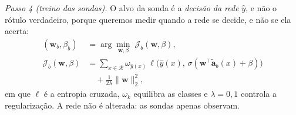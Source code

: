 \emph{Passo 4 (treino das sondas).} O alvo da sonda é a \emph{decisão da rede} $\hat y$, e não o rótulo verdadeiro, porque queremos medir
quando a rede se decide, e não se ela acerta:
\begin{align}
  (\mathbf{w}_b, \beta_b) &= \arg\min_{\mathbf{w},\beta}\; \mathcal{J}_b(\mathbf{w},\beta), \label{eq:treino_sonda}\\
  \mathcal{J}_b(\mathbf{w},\beta) &= \sum_{x \in \mathcal{R}} \omega_{\hat y(x)}\,
     \ell\big(\hat y(x),\, \sigma(\mathbf{w}^{\top}\tilde{\mathbf{a}}_b(x) + \beta)\big) \nonumber\\
     &\quad + \tfrac{1}{2\lambda}\lVert \mathbf{w} \rVert_2^2, \nonumber
\end{align}
em que $\ell$ é a entropia cruzada, $\omega_k$ equilibra as classes e $\lambda = 0{,}1$ controla a regularização. A rede não é alterada:
as sondas apenas observam.

